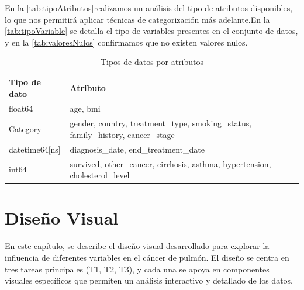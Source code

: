 \documentclass[10pt,journal,compsoc]{IEEEtran}
\begin{document}
En la \autoref{tab:tipoAtributos}realizamos un análisis del tipo de atributos disponibles, lo que nos permitirá aplicar técnicas de categorización más adelante.En la \autoref{tab:tipoVariable} se detalla el tipo de variables presentes en el conjunto de datos, y en la \autoref{tab:valoresNulos} confirmamos que no existen valores nulos.





\begin{table}[h!]
\centering
\begin{tabularx}{\columnwidth}{|l|X|}
\hline
\textbf{Tipo de dato}   & \textbf{Atributo}  \\ \hline
float64                 & age, bmi    \\ \hline
Category                & gender, country, treatment\_type, smoking\_status, family\_history, cancer\_stage  \\ \hline
datetime64[ns]          & diagnosis\_date, end\_treatment\_date   \\ \hline
int64                   & survived, other\_cancer, cirrhosis, asthma, hypertension, cholesterol\_level   \\ \hline
\end{tabularx}
\caption{Tipos de datos por atributos}
\label{tab:tipoAtributos}
\end{table}



\section{Diseño Visual}
En este capítulo, se describe el diseño visual desarrollado para explorar la influencia de diferentes variables en el cáncer de pulmón. El diseño se centra en tres tareas principales (T1, T2, T3), y cada una se apoya en componentes visuales específicos que permiten un análisis interactivo y detallado de los datos.
\end{document}
